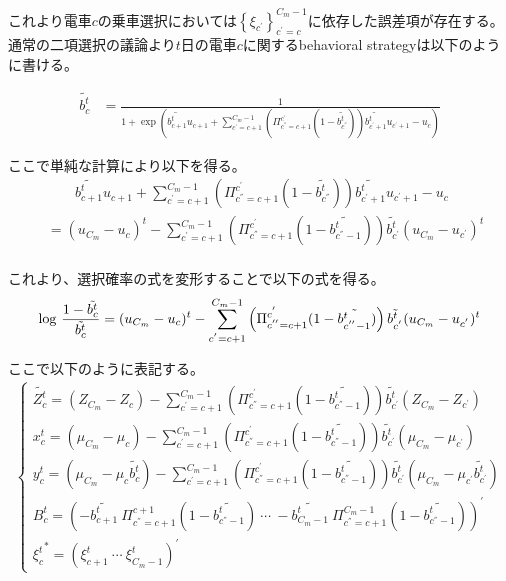 \documentclass{jsarticle}
\begin{document}
これより電車$c$の乗車選択においては$\left\{ \xi_{c^{'}} \right\}_{c^{'} = c}^{C_m-1}$に依存した誤差項が存在する。通常の二項選択の議論より$t$日の電車$c$に関するbehavioral strategyは以下のように書ける。

\begin{align*}
	\tilde{b_c^t} &= \frac{1}{1 + \exp \left(\tilde{b_{c+1}^t} u_{c+1} + \sum_{c^{'}=c+1}^{C_m-1} \left( \Pi_{c^{''} = c+1}^{c^{'}} (1 - \tilde{b_{c^{''}}^t}) \right) \tilde{b_{c^{'} + 1}^t} u_{c^{'} + 1} - u_c \right)}
\end{align*}

ここで単純な計算により以下を得る。
\begin{align*}
	&\qquad \tilde{b_{c+1}^t} u_{c+1} + \sum_{c^{'}=c+1}^{C_m-1} \left( \Pi_{c^{''} = c+1}^{c^{'}} (1 - \tilde{b_{c^{''}}^t}) \right) \tilde{b_{c^{'} + 1}^t} u_{c^{'} + 1} - u_c\\[8pt]
	&= (u_{C_m} - u_c)^t - \sum_{c^{'} = c+1}^{C_m - 1} \left( \Pi_{c^{''} = c+1}^{c^{'}} (1 - \tilde{b_{c^{''} - 1}^t}) \right) \tilde{b_{c^{'}}^t} (u_{C_m} - u_{c^{'}})^t\\[8pt]
\end{align*}

これより、選択確率の式を変形することで以下の式を得る。
\begin{align}
	{\rm log}\ \frac{1 - \tilde{{b_c^t}}}{\tilde{b_c^t}} = (u_{C_m} - u_c)^t - \sum_{c^{'} = c+1}^{C_m - 1} \left( \Pi_{c^{''} = c+1}^{c^{'}} (1 - \tilde{b_{c^{''} - 1}^t}) \right) \tilde{b_{c^{'}}^t} (u_{C_m} - u_{c^{'}})^t
\end{align}

ここで以下のように表記する。
\begin{align*}
	\begin{cases}
		\tilde{Z_c^t} = (Z_{C_m} - Z_c) - \sum_{c^{'} = c+1}^{C_m - 1} \left( \Pi_{c^{''} = c+1}^{c^{'}} (1 - \tilde{b_{c^{''} - 1}^t}) \right) \tilde{b_{c^{'}}^t} (Z_{C_m} - Z_{c^{'}})\\[8pt]
		x_c^t = (\mu_{C_m} - \mu_c) - \sum_{c^{'} = c+1}^{C_m - 1} \left( \Pi_{c^{''} = c+1}^{c^{'}} (1 - \tilde{b_{c^{''} - 1}^t}) \right) \tilde{b_{c^{'}}^t} (\mu_{C_m} - \mu_{c^{'}})\\[8pt]
		y_c^t = (\mu_{C_m} - \mu_c \tilde{b_c^t}) - \sum_{c^{'} = c+1}^{C_m - 1} \left( \Pi_{c^{''} = c+1}^{c^{'}} (1 - \tilde{b_{c^{''} - 1}^t}) \right) \tilde{b_{c^{'}}^t} (\mu_{C_m} - \mu_{c^{'}} \tilde{b_{c^{'}}^t})\\[8pt]
		B_c^t = \left( -\tilde{b_{c+1}^t}\ \Pi_{c^{''} = c+1}^{c+1}(1 - \tilde{b_{c^{''} -1}^t})\ \cdots\ -\tilde{b_{C_m-1}^t}\ \Pi_{c^{''} = c+1}^{C_m-1}(1 - \tilde{b_{c^{''} -1}^t})\right)^{'}\\[8pt]
		{\xi_c^t}^{*} = \left( \xi_{c+1}^t\ \cdots\ \xi_{C_m-1}^t \right)^{'}
	\end{cases}
\end{align*}
\end{document}
